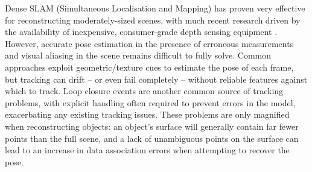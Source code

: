 Dense SLAM (Simultaneous Localisation and Mapping) has proven very effective for reconstructing moderately-sized scenes,
with much recent research driven by the availability of inexpensive, consumer-grade depth sensing equipment \cite{Newcombe2011,Niessner2013,Prisacariu2014}. 
However, accurate pose estimation in the presence of erroneous measurements and visual aliasing in the scene remains difficult to fully solve. Common approaches \cite{Besl1992,Levoy2001} exploit geometric/texture cues to estimate the pose of each frame, but tracking can drift -- or even fail completely -- without reliable features against which to track.
Loop closure events are another common source of tracking problems, with explicit handling often required to prevent errors in the model, exacerbating any existing tracking issues.
These problems are only magnified when reconstructing objects: an object's surface will generally contain far fewer points than the full scene, and a lack of unambiguous points on the surface can lead to an increase in data association errors when attempting to recover the pose.



